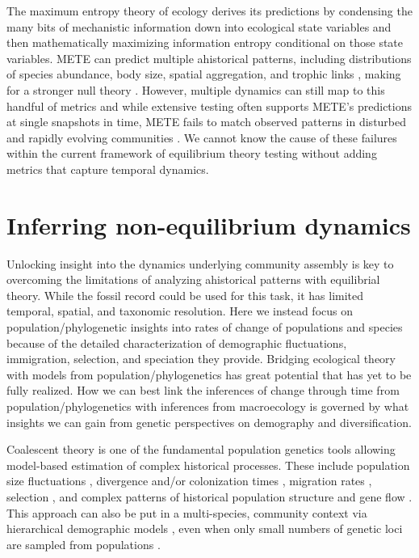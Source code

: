 \documentclass[12pt]{article}
\begin{document}
The maximum entropy theory of ecology \citep[METE;][]{harte2011}
derives its predictions by condensing the many bits of mechanistic
information down into ecological state variables and then
mathematically maximizing information entropy conditional on those
state variables. METE can predict multiple ahistorical patterns,
including distributions of species abundance, body size, spatial
aggregation, and trophic links \citep{harte2011, rominger2015}, making
for a stronger null theory \citep{mcgill2003}. However, multiple
dynamics can still map to this handful of metrics \citep{mcgill2007}
and while extensive testing often supports METE's predictions
\citep{harte2011, white2012, xiao2015} at single snapshots in time,
METE fails to match observed patterns in disturbed and rapidly
evolving communities \citep{rominger2015, harte2011}. We cannot know
the cause of these failures within the current framework of
equilibrium theory testing without adding metrics that capture
temporal dynamics.


\section{Inferring non-equilibrium dynamics}

Unlocking insight into the dynamics underlying community assembly is
key to overcoming the limitations of analyzing ahistorical patterns
with equilibrial theory. While the fossil record could be used for
this task, it has limited temporal, spatial, and taxonomic
resolution. Here we instead focus on population/phylogenetic insights
into rates of change of populations and species because of the
detailed characterization of demographic fluctuations, immigration,
selection, and speciation they provide. Bridging ecological theory
with models from population/phylogenetics has great potential
\citep{webb2002, lavergne2010, mcgaughran2015, laroche2015,
  papadopoulou2011, dexter2012} that has yet to be fully realized. How
we can best link the inferences of change through time from
population/phylogenetics with inferences from macroecology is governed
by what insights we can gain from genetic perspectives on demography
and diversification.

Coalescent theory \citep{kingman1982stochasti, rosenberg2002} is one
of the fundamental population genetics tools allowing model-based
estimation of complex historical processes. These include population
size fluctuations \citep{kuhner1998}, divergence and/or colonization
times \citep{charlesworth2010, edwards2000}, migration rates
\citep{wakeley2008}, selection \citep{kern2016}, and complex patterns
of historical population structure \citep{prado-martinez2013} and gene
flow \citep{beerli2001, hey2004}. This approach can also be put in a
multi-species, community context via hierarchical demographic models
\citep{xue2015, hickerson2006, carstens2016, chan2014}, even when only
small numbers of genetic loci are sampled from populations
\citep{drummond2005}.
\end{document}
